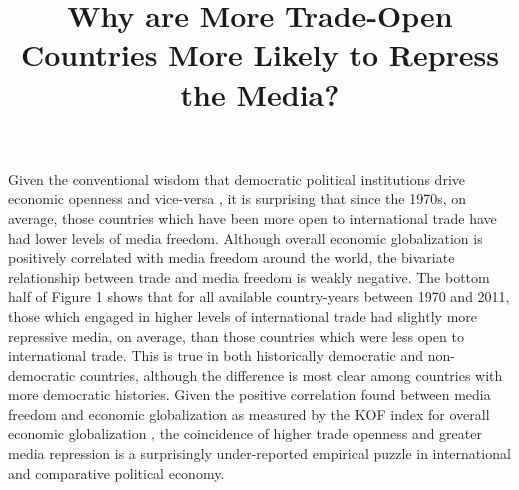 \documentclass[12pt,a4paper]{article}\usepackage[]{graphicx}\usepackage[]{color}
\begin{document}
\title{Why are More Trade-Open Countries More Likely to Repress the Media?}
\date{}

\maketitle

Given the conventional wisdom that democratic political institutions drive economic openness \parencite{Milner:2005ci} and vice-versa \parencite{EICHENGREEN:2008gg}, it is surprising that since the 1970s, on average, those countries which have been more open to international trade have had lower levels of media freedom. Although overall economic globalization is positively correlated with media freedom around the world, the bivariate relationship between trade and media freedom is weakly negative. The bottom half of Figure 1 shows that for all available country-years between 1970 and 2011, those which engaged in higher levels of international trade had slightly more repressive media, on average, than those countries which were less open to international trade. This is true in both historically democratic and non-democratic countries, although the difference is most clear among countries with more democratic histories. Given the positive correlation found between media freedom and economic globalization as measured by the KOF index for overall economic globalization \parencite{Dreher:2008dg}, the coincidence of higher trade openness and greater media repression is a surprisingly under-reported empirical puzzle in international and comparative political economy.
\end{document}
